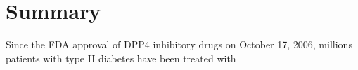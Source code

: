\section{\label{chap:Sum} Summary}
Since the FDA approval of DPP4 inhibitory drugs on October 17, 2006, millions patients with type II diabetes have been treated with

